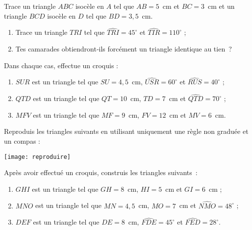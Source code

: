 \begin{exercice}
Trace un triangle $ABC$ isocèle en $A$ tel que $AB = 5$ cm et $BC = 3$ cm et un triangle $BCD$ isocèle en $D$ tel que $BD = 3,5$ cm.
\end{exercice}


\begin{exercice}
 \begin{enumerate}
  \item Trace un triangle $TRI$ tel que $\widehat{TRI} = 45^\circ$ et  $\widehat{TIR} = 110^\circ$ ;
  \item Tes camarades obtiendront‑ils forcément un triangle identique au tien ?
  \end{enumerate}
\end{exercice}


\begin{exercice}
Dans chaque cas, effectue un croquis :
 \begin{enumerate}
  \item $SUR$ est un triangle tel que $SU = 4,5$ cm, $\widehat{USR} = 60^\circ$ et $\widehat{RUS} = 40^\circ$ ;
  \item $QTD$ est un triangle tel que $QT = 10$ cm, $TD = 7$ cm et $\widehat{QTD} = 70^\circ$ ;
  \item $MFV$ est un triangle tel que $MF = 9$ cm, $FV = 12$ cm et $MV = 6$ cm.
  \end{enumerate}
\end{exercice}


\begin{exercice}
Reproduis les triangles suivants en utilisant uniquement une règle non graduée et un compas :
\begin{center} \texttt{[image: reproduire]} \end{center}
\end{exercice}


\begin{exercice}
Après avoir effectué un croquis, construis les triangles suivants :
 \begin{enumerate}
  \item $GHI$ est un triangle tel que $GH = 8$ cm, $HI = 5$ cm et $GI = 6$ cm ;
  \item $MNO$ est un triangle tel que $MN = 4,5$ cm, $MO = 7$ cm et $\widehat{NMO} = 48^\circ$ ;
  \item $DEF$ est un triangle tel que $DE = 8$ cm, $\widehat{FDE} = 45^\circ$ et $\widehat{FED} = 28^\circ$. 
  \end{enumerate}
\end{exercice}


